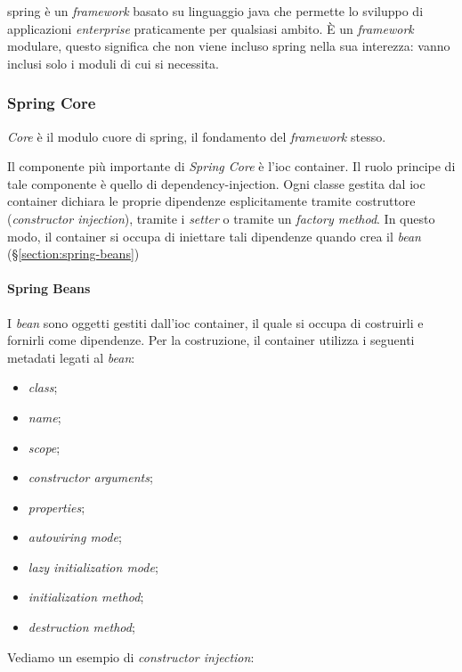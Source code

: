 \gls{spring} è un \textit{framework} basato su linguaggio \gls{java} che permette lo sviluppo di applicazioni \textit{enterprise} praticamente per qualsiasi ambito.
È un \textit{framework} modulare, questo significa che non viene incluso \gls{spring} nella sua interezza: vanno inclusi solo i moduli di cui si necessita.

\subsubsection{Spring Core}

\textit{Core} è il modulo cuore di \gls{spring}, il fondamento del \textit{framework} stesso.

Il componente più importante di \textit{Spring Core} è l'\gls{ioc} container. Il ruolo principe di tale componente è quello di \gls{dependency-injection}\gloss.
Ogni classe gestita dal \gls{ioc} container dichiara le proprie dipendenze esplicitamente tramite costruttore (\textit{constructor injection}), tramite i \textit{setter} o tramite un \textit{factory method}.
In questo modo, il container si occupa di iniettare tali dipendenze quando crea il \textit{bean} (\S\ref{section:spring-beans})

\paragraph*{Spring Beans}\label{section:spring-beans} I \textit{bean} sono oggetti gestiti dall'\gls{ioc} container, il quale si occupa di costruirli e fornirli come dipendenze. Per la costruzione, il container utilizza i seguenti metadati legati al \textit{bean}:
\begin{itemize}
	\item \textit{class};
	\item \textit{name};
	\item \textit{scope};
	\item \textit{constructor arguments};
	\item \textit{properties};
	\item \textit{autowiring mode};
	\item \textit{lazy initialization mode};
	\item \textit{initialization method};
	\item \textit{destruction method};
\end{itemize}

Vediamo un esempio di \textit{constructor injection}:

